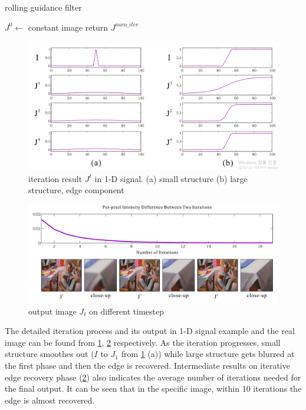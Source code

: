 \documentclass[extendedabs]{bmvc2k}
\begin{document}
\begin{algorithm}
    \caption{rolling guidance filter}
    $J^0 \gets$ constant image\;
    return $J^{num\_iter}$\;
\end{algorithm}

\begin{figure}[h]
    \centering
    \includegraphics[width=\linewidth]{hw2_1_2}
    \caption{iteration result $J^t$ in 1-D signal. (a) small structure 
    (b) large structure, edge component}
    \label{fig:2}
\end{figure}

\begin{figure}[h]
    \centering
    \includegraphics[width=\linewidth]{hw2_1_7}
    \caption{output image $J_t$ on different timestep}
    \label{fig:7}
\end{figure}

The detailed iteration process and its output in 1-D signal example and the real image can be
found from \figurename{\ref{fig:2}}, \figurename{\ref{fig:7}} respectively.
As the iteration progresses, small structure smoothes out ($I$ to $J_1$ from 
\figurename{\ref{fig:2}} (a)) while large structure gets blurred
at the first phase and then the edge is recovered.
Intermediate results on iterative edge recovery phase (\figurename{\ref{fig:7}}) also indicates 
the average number of iterations needed for the final output. It can be seen that in the
specific image, within 10 iterations the edge is almost recovered.
\end{document}
